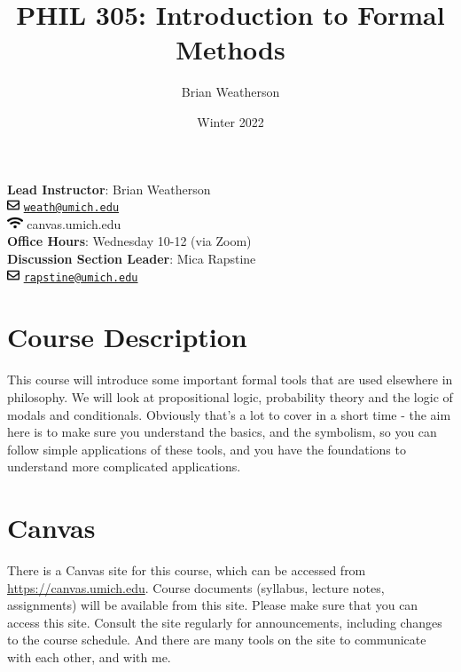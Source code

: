 \documentclass[
]{article}
\title{PHIL 305: Introduction to Formal Methods}
\author{Brian Weatherson}
\date{Winter 2022}
\begin{document}
\maketitle

\textbf{Lead Instructor}: Brian Weatherson\\
\includegraphics[width=1em,height=1em]{figs/fa-icon-851abd0b78479f510d18caf2daa1d792.pdf}
\href{mailto:weath@umich.edu}{\nolinkurl{weath@umich.edu}}\\
\includegraphics[width=1.25em,height=1em]{figs/fa-icon-4afc4ec86e4719f7fac10dc1a986382a.pdf}
canvas.umich.edu\\
\textbf{Office Hours}: Wednesday 10-12 (via Zoom)\\
\textbf{Discussion Section Leader}: Mica Rapstine\\
\includegraphics[width=1em,height=1em]{figs/fa-icon-851abd0b78479f510d18caf2daa1d792.pdf}
\href{mailto:rapstine@umich.edu}{\nolinkurl{rapstine@umich.edu}}

\hypertarget{course-description}{%
\section{Course Description}\label{course-description}}

This course will introduce some important formal tools that are used
elsewhere in philosophy. We will look at propositional logic,
probability theory and the logic of modals and conditionals. Obviously
that's a lot to cover in a short time - the aim here is to make sure you
understand the basics, and the symbolism, so you can follow simple
applications of these tools, and you have the foundations to understand
more complicated applications.

\hypertarget{canvas}{%
\section{Canvas}\label{canvas}}

There is a Canvas site for this course, which can be accessed from
\url{https://canvas.umich.edu}. Course documents (syllabus, lecture
notes, assignments) will be available from this site. Please make sure
that you can access this site. Consult the site regularly for
announcements, including changes to the course schedule. And there are
many tools on the site to communicate with each other, and with me.
\end{document}
